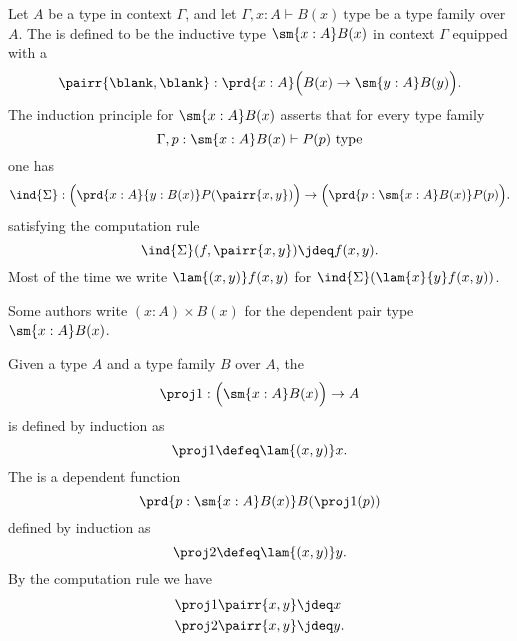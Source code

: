 \begin{defn}
Let $A$ be a type in context $\Gamma$, and let $\Gamma,x:A\vdash B(x)~\mathrm{type}$ be a type family over $A$.
The  is defined to be the inductive type $\sm{x:A}B(x)$ in context $\Gamma$ equipped with a 
\begin{equation*}
\pairr{\blank,\blank}:\prd{x:A} \Big(B(x)\to \sm{y:A}B(y)\Big).
\end{equation*}
The induction principle for $\sm{x:A}B(x)$ asserts that for every type family 
\begin{equation*}
\Gamma,p:\sm{x:A}B(x)\vdash P(p)~\mathrm{type}
\end{equation*}
one has
\begin{equation*}
\ind{\Sigma}:\Big(\prd{x:A}{y:B(x)}P(\pairr{x,y})\Big)\to\Big(\prd{p:\sm{x:A}B(x)}P(p)\Big).
\end{equation*}
satisfying the computation rule
\begin{equation*}
\ind{\Sigma}(f,\pairr{x,y})\jdeq f(x,y).
\end{equation*}
Most of the time we write $\lam{(x,y)}f(x,y)$ for $\ind{\Sigma}(\lam{x}{y}f(x,y))$. 
\end{defn}

\begin{rmk}
Some authors write $(x:A)\times B(x)$ for the dependent pair type $\sm{x:A}B(x)$. 
\end{rmk}

\begin{defn}
Given a type $A$ and a type family $B$ over $A$, the 
\begin{equation*}
\proj 1:\Big(\sm{x:A}B(x)\Big)\to A
\end{equation*}
is defined by induction as
\begin{equation*}
\proj 1\defeq \lam{(x,y)}x.
\end{equation*}
The  is a dependent function
\begin{equation*}
\prd{p:\sm{x:A}B(x)} B(\proj 1(p))
\end{equation*}
defined by induction as
\begin{equation*}
\proj 2\defeq \lam{(x,y)}y.
\end{equation*}
By the computation rule we have
\begin{align*}
\proj 1 \pairr{x,y} & \jdeq x \\
\proj 2 \pairr{x,y} & \jdeq y.
\end{align*}
\end{defn}

